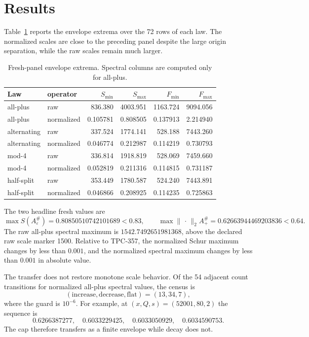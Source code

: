 \documentclass[10pt]{article}
\newcommand{\opnorm}{\lVert\,\cdot\,\rVert_2}
\begin{document}
\section{Results}

Table~\ref{tab:extrema} reports the envelope extrema over the 72 rows of each
law.  The normalized scales are close to the preceding panel despite the
large origin separation, while the raw scales remain much larger.

\begin{table}[t]
\centering
\caption{Fresh-panel envelope extrema.  Spectral columns are computed only
for all-plus.}
\label{tab:extrema}
\small
\begin{tabular}{llrrrr}
\toprule
Law & operator & $S_{\min}$ & $S_{\max}$ & $F_{\min}$ & $F_{\max}$\\
\midrule
all-plus & raw & 836.380 & 4003.951 & 1163.724 & 9094.056\\
all-plus & normalized & 0.105781 & 0.808505 & 0.137913 & 2.214940\\
alternating & raw & 337.524 & 1774.141 & 528.188 & 7443.260\\
alternating & normalized & 0.046774 & 0.212987 & 0.114219 & 0.730793\\
mod-4 & raw & 336.814 & 1918.819 & 528.069 & 7459.660\\
mod-4 & normalized & 0.052819 & 0.211316 & 0.114815 & 0.731187\\
half-split & raw & 353.449 & 1780.587 & 524.240 & 7443.891\\
half-split & normalized & 0.046866 & 0.208925 & 0.114235 & 0.725863\\
\bottomrule
\end{tabular}
\end{table}

The two headline fresh values are
\begin{equation}
 \max S(A_\varepsilon^\#)=0.80850510742101689<0.83,
 \qquad
 \max\opnorm{A_{+}^\#}=0.62663944469203836<0.64.
 \label{eq:headline}
\end{equation}
The raw all-plus spectral maximum is
$1542.7492651981368$, above the declared raw scale marker 1500.  Relative to
TPC-357, the normalized Schur maximum changes by less than $0.001$, and the
normalized spectral maximum changes by less than $0.001$ in absolute value.

The transfer does not restore monotone scale behavior.  Of the 54 adjacent
count transitions for normalized all-plus spectral values, the census is
\[
 (\text{increase},\text{decrease},\text{flat})=(13,34,7),
\]
where the guard is $10^{-6}$.  For example, at $(x,Q,s)=(52001,80,2)$ the
sequence is
\[
 0.6266387277,\quad 0.6033229425,\quad
 0.6033050929,\quad 0.6034590753.
\]
The cap therefore transfers as a finite envelope while decay does not.
\end{document}
